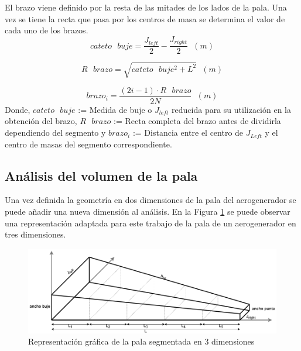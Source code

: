 El brazo viene definido por la resta de las mitades de los lados de la pala. Una vez se tiene la recta que pasa por los centros de masa se determina el valor de cada uno de los brazos.
\begin{equation}
cateto \text{ } buje = \dfrac{J_{left}}{2} - \dfrac{J_{right}}{2} \hspace{7pt} (m)
\end{equation}

\begin{equation}
R \text{ } brazo = \sqrt{cateto \text{ } buje^{2} + L^{2}} \hspace{7pt} (m)
\end{equation}

\begin{equation}
brazo_i = \dfrac{(2i -1) \cdot R \text{ } brazo}{2N} \hspace{7pt} (m)
\end{equation}
Donde, $cateto \text{ } buje$ := Medida de buje o $J_{left}$ reducida para su utilización en la obtención del brazo, $R \text{ } brazo$ := Recta completa del brazo antes de dividirla dependiendo del segmento y $brazo_i$ := Distancia entre el centro de $J_{Left}$ y el centro de masas del segmento correspondiente.

\subsection{Análisis del volumen de la pala}
\label{section:volumen_pala}

Una vez definida la geometría en dos dimensiones de la pala del aerogenerador se puede añadir una nueva dimensión al análisis. En la Figura \ref{fig:analisis_volumen} se puede observar una representación adaptada para este trabajo de la pala de un aerogenerador en tres dimensiones.

    \begin{figure}[H]
    \centering
    \includegraphics[width=1\textwidth]{images/pala 3d segmentada enorme.png}
    \caption{Representación gráfica de la pala segmentada en 3 dimensiones}
    \label{fig:analisis_volumen}
    \end{figure}




